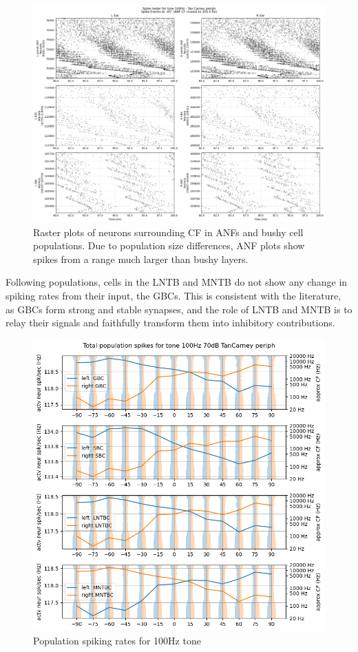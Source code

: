 \documentclass[11pt,a4paper]{article}
\begin{document}
\begin{figure}[H]
    \centering
    \includegraphics[width=0.75\linewidth]{Images/raster_bushy.png}
    \caption{Raster plots of neurons surrounding CF in ANFs and bushy cell populations. Due to population size differences, ANF plots show spikes from a range much larger than bushy layers.}
    \label{fig:res-singlespike-bushy}
\end{figure}

Following populations, cells in the LNTB and MNTB do not show any change in spiking rates from their input, the GBCs. This is consistent with the literature, as GBCs form strong and stable synapses, and the role of LNTB and MNTB is to relay their signals and faithfully transform them into inhibitory contributions.

\begin{figure}[H]
    \centering
    \includegraphics[width=0.7\linewidth]{Images/pop_spike_mntb_lntb.png}
    \caption{Population spiking rates for 100Hz tone}
    \label{fig:res-lntb-mntb-pop-rate}
\end{figure}
\end{document}
